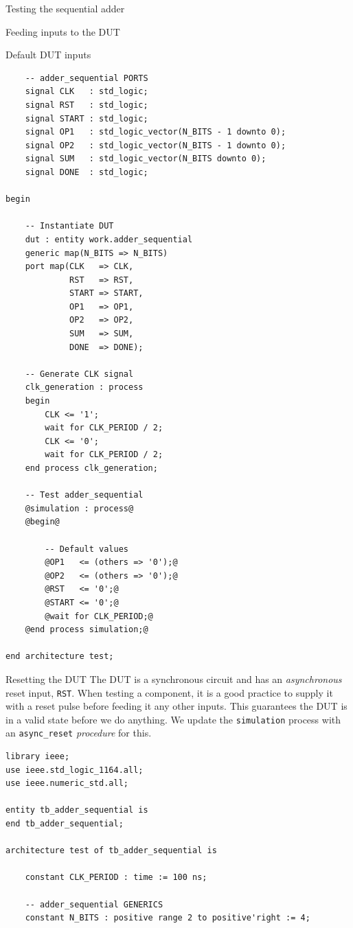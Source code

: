 \documentclass[lab]{course}
\begin{document}
\begin{section}{Testing the sequential adder}
\begin{subsection}{Feeding inputs to the DUT}
\begin{subsubsection}{Default DUT inputs}
\begin{lstlisting}
    -- adder_sequential PORTS
    signal CLK   : std_logic;
    signal RST   : std_logic;
    signal START : std_logic;
    signal OP1   : std_logic_vector(N_BITS - 1 downto 0);
    signal OP2   : std_logic_vector(N_BITS - 1 downto 0);
    signal SUM   : std_logic_vector(N_BITS downto 0);
    signal DONE  : std_logic;

begin

    -- Instantiate DUT
    dut : entity work.adder_sequential
    generic map(N_BITS => N_BITS)
    port map(CLK   => CLK,
             RST   => RST,
             START => START,
             OP1   => OP1,
             OP2   => OP2,
             SUM   => SUM,
             DONE  => DONE);

    -- Generate CLK signal
    clk_generation : process
    begin
        CLK <= '1';
        wait for CLK_PERIOD / 2;
        CLK <= '0';
        wait for CLK_PERIOD / 2;
    end process clk_generation;

    -- Test adder_sequential
    @simulation : process@
    @begin@

        -- Default values
        @OP1   <= (others => '0');@
        @OP2   <= (others => '0');@
        @RST   <= '0';@
        @START <= '0';@
        @wait for CLK_PERIOD;@
    @end process simulation;@

end architecture test;
            \end{lstlisting}
        \end{subsubsection}

        \begin{subsubsection}{Resetting the DUT}
            The DUT is a synchronous circuit and has an \emph{asynchronous} reset input, \verb+RST+. When testing a component, it is a good practice to supply it with a reset pulse before feeding it any other inputs. This guarantees the DUT is in a valid state before we do anything. We update the \verb+simulation+ process with an \verb+async_reset+ \emph{procedure} for this.

            \begin{lstlisting}[caption={Add \emph{asynchronous} reset}, label={lst:sequential_process_simulation_async_reset}]
library ieee;
use ieee.std_logic_1164.all;
use ieee.numeric_std.all;

entity tb_adder_sequential is
end tb_adder_sequential;

architecture test of tb_adder_sequential is

    constant CLK_PERIOD : time := 100 ns;

    -- adder_sequential GENERICS
    constant N_BITS : positive range 2 to positive'right := 4;


\end{lstlisting}
\end{subsubsection}
\end{subsection}
\end{section}
\end{document}
